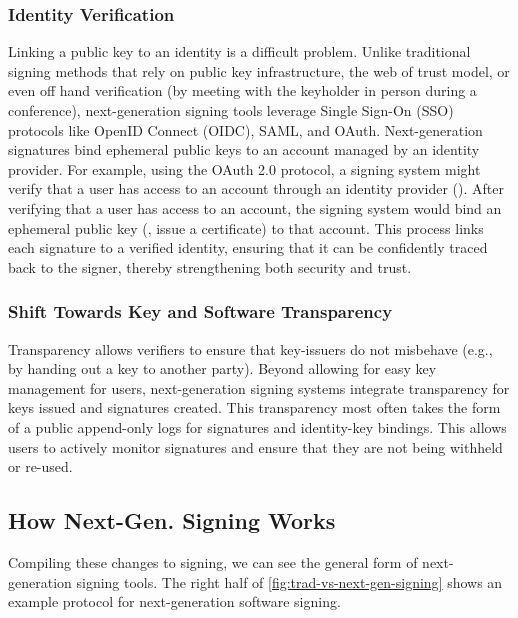 \documentclass{IEEEcsmagTechrxiv}
\begin{document}
\subsubsection{Identity Verification}
Linking a public key to an identity is a difficult problem.
Unlike traditional signing methods that rely on public key infrastructure, the web of trust model, or even off hand verification (\eg by meeting with the keyholder in person during a conference), next-generation signing tools leverage Single Sign-On (SSO) protocols like OpenID Connect (OIDC), SAML, and OAuth.
Next-generation signatures bind ephemeral public keys to an account managed by an identity provider.
For example, using the OAuth 2.0 protocol, a signing system might verify that a user has access to an account through an identity provider ().
After verifying that a user has access to an account, the signing system would bind an ephemeral public key (\ie, issue a certificate) to that account.
This process links each signature to a verified identity, ensuring that it can be confidently traced back to the signer, thereby strengthening both security and trust.

\subsubsection{Shift Towards Key and Software Transparency}
Transparency allows verifiers to ensure that key-issuers do not misbehave (e.g., by handing out a key to another party).
Beyond allowing for easy key management for users, next-generation signing systems integrate transparency for keys issued and signatures created.
This transparency most often takes the form of a public append-only logs for signatures and identity-key bindings.
This allows users to actively monitor signatures and ensure that they are not being withheld or re-used.

\subsection{How Next-Gen. Signing Works}

Compiling these changes to signing, we can see the general form of next-generation signing tools.
The right half of \cref{fig:trad-vs-next-gen-signing} shows an example protocol for next-generation software signing.
\end{document}
